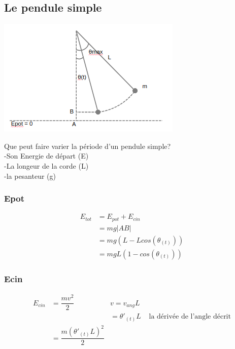 \documentclass[11pt]{article}
\begin{document}
\subsection{Le pendule simple}


\includegraphics{testSimplePendulum.png}

Que peut faire varier la période d'un pendule simple? \\
-Son Energie de départ (E) \\
-La longeur de la corde (L) \\
-la pesanteur (g) \\

\subsubsection{Epot}
\begin{equation}
\begin{split}
    E_{tot} & = E_{pot} + E_{cin} \\
    & = mg|AB| \\
    & = mg(L-Lcos(\theta_{(t)})) \\
    & = mgL(1-cos(\theta_{(t)}))
\end{split}
\end{equation}

\subsubsection{Ecin}
\begin{align*}
E_{cin} & = \dfrac{mv^2}{2}  & v = v_{ang}L \\
&     & = \theta ' _{(t)}L & \text{ la dérivée de l'angle décrit} \\
& = \dfrac{m(\theta ' _{(t)} L)^2}{2}\\
\end{align*}
\end{document}
